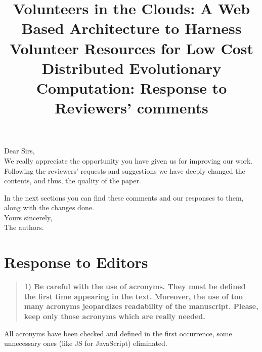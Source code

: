 \documentclass[preprint]{elsarticle}
\begin{document}

\title{Volunteers in the Clouds: A Web Based Architecture to Harness Volunteer Resources 
for Low Cost Distributed Evolutionary Computation: Response to Reviewers' comments}

\noindent
Dear Sirs,\\

We really appreciate the opportunity you have given us for improving
our work. Following the reviewers' requests and suggestions we have
deeply changed the contents, and thus, the quality of the paper. 

In the next sections you can find these comments and our responses
to them, along with the changes done.\\ 

\noindent
Yours sincerely,\\
The authors.


\section{Response to Editors}


\begin{quote}
\textbf{1) Be careful with the use of acronyms. They must be defined
  the first time appearing in the text. Moreover, the use of too many
  acronyms jeopardizes readability of the manuscript. Please, keep
  only those acronyms which are really needed.\\}
\end{quote}

All acronyms have been checked and defined in the first occurrence,
some unnecessary ones (like JS for JavaScript) eliminated. 
\end{document}
